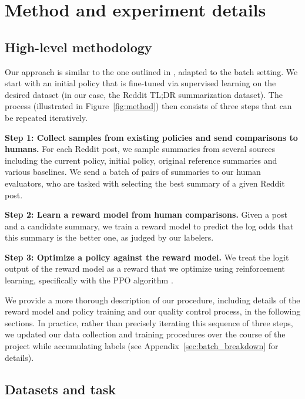\section{Method and experiment details}
\label{sec:expdetails}

\subsection{High-level methodology}

Our approach is similar to the one outlined in \cite{ziegler2019fine}, adapted to the batch setting. We start with an initial policy that is fine-tuned via supervised learning on the desired dataset (in our case, the Reddit TL;DR summarization dataset). The process (illustrated in Figure~\ref{fig:method}) then consists of three steps that can be repeated iteratively. 

\textbf{Step 1: Collect samples from existing policies and send comparisons to humans.} For each Reddit post, we sample summaries from several sources including the current policy, initial policy, original reference summaries and various baselines. We send a batch of pairs of summaries to our human evaluators, who are tasked with selecting the best summary of a given Reddit post.  

\textbf{Step 2: Learn a reward model from human comparisons.} Given a post and a candidate summary, we train a reward model to predict the log odds that this summary is the better one, as judged by our labelers.

\textbf{Step 3: Optimize a policy against the reward model.} We treat the logit output of the reward model as a reward that we optimize using reinforcement learning, specifically with the PPO algorithm \cite{schulman2017proximal}. 

We provide a more thorough description of our procedure, including details of the reward model and policy training and our quality control process, in the following sections.  In practice, rather than precisely iterating this sequence of three steps, we updated our data collection and training procedures over the course of the project while accumulating labels (see Appendix~\ref{sec:batch_breakdown} for details). 

\subsection{Datasets and task}

\label{sec:dataset}
